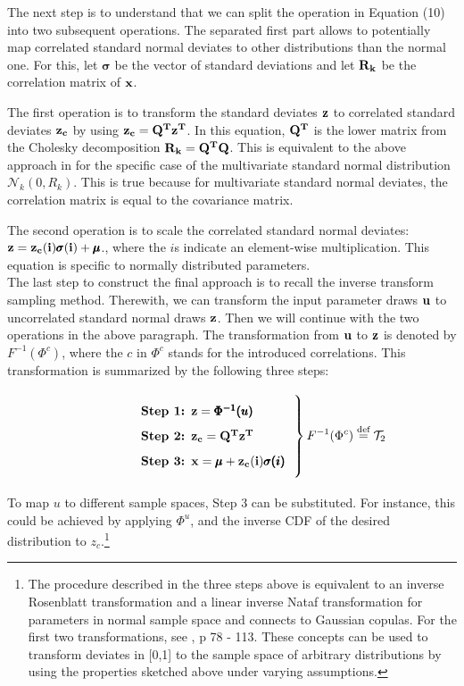 \documentclass[a4paper,12pt]{article}
\newcommand*{\defeq}{\stackrel{\text{def}}{=}}
\begin{document}
\noindent
The next step is to understand that we can split the operation in Equation (10) into two subsequent operations. The separated first part allows to potentially map correlated standard normal deviates to other distributions than the normal one. For this, let $\pmb{\sigma}$ be the vector of standard deviations and let $\bold{R_k}$ be the correlation matrix of $\bold{x}$.

The first operation is to transform the standard deviates $\bold{z}$ to correlated standard deviates $\bold{z_c}$ by using $\bold{z_c}=\bold{Q^T z^T}$. In this equation, $\bold{Q^T}$ is the lower matrix from the Cholesky decomposition $\bold{R_k}=\bold{Q^T Q}$. This is equivalent to the above approach in \cite{gentle2006random} for the specific case of the multivariate standard normal distribution $\mathcal{N}_k(0, R_k)$. This is true because for multivariate standard normal deviates, the correlation matrix is equal to the covariance matrix.

The second operation is to scale the correlated standard normal deviates: $\bold{z}=\bold{z_c(i)}\pmb{\sigma}\bold{(i)} + \pmb{\mu}$., where the $i$s indicate an element-wise multiplication. This equation is specific to normally distributed parameters.\\

\noindent
The last step to construct the final approach is to recall the inverse transform sampling method. Therewith, we can transform the input parameter draws $\bold{u}$ to uncorrelated standard normal draws $\bold{z}$. Then we will continue with the two operations in the above paragraph. The transformation from $\bold{u}$ to $\bold{z}$ is denoted by $ F^{-1}(\Phi^c)$, where the $c$ in  $\Phi^c$ stands for the introduced correlations. This transformation is summarized by the following three steps:


\[
\left.\parbox{0.5\textwidth}{%
\begin{enumerate}[label=\bfseries Step \arabic*:,leftmargin=*,labelindent=5em]
	\item $\bold{z} = \pmb{\Phi^{-1}({u})}$
    \item $\bold{z_c} = \bold{Q^T z^T}$
    \item $\bold{x} = \pmb{\mu} + \bold{z_c(i)}\pmb{\sigma(i)}$
\end{enumerate}
}\right\}F^{-1}(\Phi^c) \defeq \mathcal{T}_2
\]

\noindent
To map $u$ to different sample spaces, Step 3 can be substituted. For instance, this could be achieved by applying $\Phi^u$, and the inverse CDF of the desired distribution to $z_c$.\footnote{The procedure described in the three steps above is equivalent to an inverse Rosenblatt transformation and a linear inverse Nataf transformation for parameters in normal sample space and connects to Gaussian copulas. For the first two transformations, see \cite{lemaire2013structural}, p 78 - 113. These concepts can be used to transform deviates in [0,1] to the sample space of arbitrary distributions by using the properties sketched above under varying assumptions.}\\
\end{document}
